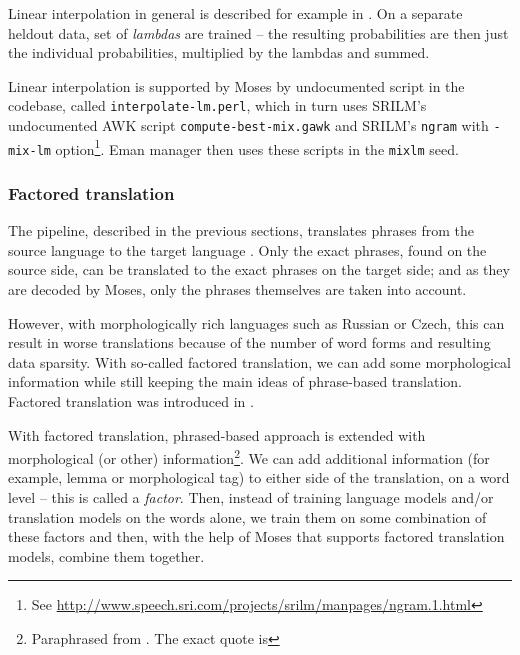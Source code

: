 Linear interpolation in general is described for example in \cite{gutkin}. On a separate heldout data, set of \emph{lambdas} are trained -- the resulting probabilities are then just the individual probabilities, multiplied by the lambdas and summed.

Linear interpolation is supported by Moses by undocumented script in the codebase, called \texttt{interpolate-lm.perl}, which in turn uses SRILM's undocumented AWK script \texttt{compute-best-mix.gawk} and SRILM's \texttt{ngram} with \texttt{-mix-lm} option\footnote{See \url{http://www.speech.sri.com/projects/srilm/manpages/ngram.1.html}}. 
Eman manager then uses these scripts in the \texttt{mixlm} seed.


\subsubsection{Factored translation}

The pipeline, described in the previous sections, translates phrases from the source language to the target language . Only the exact phrases, found on the source side, can be translated to the exact phrases on the target side; and as they are decoded by Moses, only the phrases themselves are taken into account.

However, with morphologically rich languages such as Russian or Czech, this can result in worse translations because of the number of word forms and resulting data sparsity.
With so-called factored translation, we can add some morphological information while still keeping the main ideas of phrase-based translation. Factored translation was introduced in \cite{factored}.

With factored translation, 
phrased-based approach is extended with 
morphological (or other) information\footnote{Paraphrased from \cite{factored}. The exact quote is }. We can add additional information (for example, lemma or morphological tag) to either side of the translation, on a word level -- this is called a \emph{factor}. Then, instead of training language models and/or translation models on the words alone, we train them on some combination of these factors and then, with the help of Moses that supports factored translation models, combine them together.

